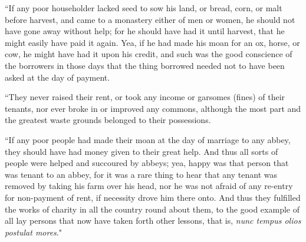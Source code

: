 \documentclass{book}
\begin{document}
“If any poor householder lacked seed to sow his land, or bread, corn, or malt before harvest, and came to a monastery either of men or women, he should not have gone away without help; for he should have had it until harvest, that he might easily have paid it again. Yea, if he had made his moan for an ox, horse, or cow, he might have had it upon his credit, and such was the good conscience of the borrowers in those days that the thing borrowed needed not to have been asked at the day of payment.

“They never raised their rent, or took any income or garsomes (fines) of their tenants, nor ever broke in or improved any commons, although the most part and the greatest waste grounds belonged to their possessions.

“If any poor people had made their moan at the day of marriage to any abbey, they should have had money given to their great help. And thus all sorts of people were helped and succoured by abbeys; yea, happy was that person that was tenant to an abbey, for it was a rare thing to hear that any tenant was removed by taking his farm over his head, nor he was not afraid of any re-entry for non-payment of rent, if necessity drove him there onto. And thus they fulfilled the works of charity in all the country round about them, to the good example of all lay persons that now have taken forth other lessons, that is, \emph{nunc tempus olios postulat mores}."\footnotemark[7]
\end{document}
